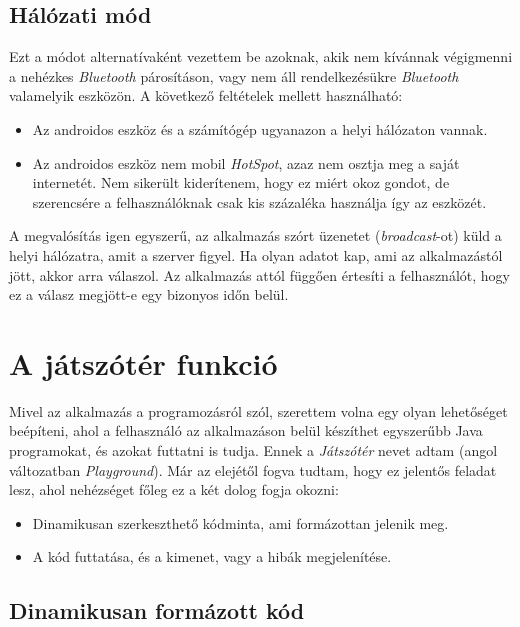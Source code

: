 \documentclass[12pt,a4paper]{article}
\begin{document}
	\subsection{Hálózati mód}
	
	Ezt a módot alternatívaként vezettem be azoknak, akik nem kívánnak végigmenni a nehézkes \textit{Bluetooth} párosításon, vagy nem áll rendelkezésükre \textit{Bluetooth} valamelyik eszközön. A következő feltételek mellett használható:
	
	\begin{itemize}
		\item Az androidos eszköz és a számítógép ugyanazon a helyi hálózaton vannak.
		\item Az androidos eszköz nem mobil \textit{HotSpot}, azaz nem osztja meg a saját internetét. Nem sikerült kiderítenem, hogy ez miért okoz gondot, de szerencsére a felhasználóknak csak kis százaléka használja így az eszközét.
	\end{itemize}

	A megvalósítás igen egyszerű, az alkalmazás szórt üzenetet (\textit{broadcast}-ot) küld a helyi hálózatra, amit a szerver figyel. Ha olyan adatot kap, ami az alkalmazástól jött, akkor arra válaszol. Az alkalmazás attól függően értesíti a felhasználót, hogy ez a válasz megjött-e egy bizonyos időn belül.  
	
	\section{A játszótér funkció}\label{playground}

	Mivel az alkalmazás a programozásról szól, szerettem volna egy olyan lehetőséget beépíteni, ahol a felhasználó az alkalmazáson belül készíthet egyszerűbb Java programokat, és azokat futtatni is tudja. Ennek a \textit{Játszótér} nevet adtam (angol változatban \textit{Playground}). Már az elejétől fogva tudtam, hogy ez jelentős feladat lesz, ahol nehézséget főleg ez a két dolog fogja okozni:
	
	\begin{itemize}
		\item Dinamikusan szerkeszthető kódminta, ami formázottan jelenik meg.
		\item A kód futtatása, és a kimenet, vagy a hibák megjelenítése.
	\end{itemize}

	\subsection{Dinamikusan formázott kód}\label{dinamikusan_formazott_kod}
	
\end{document}

